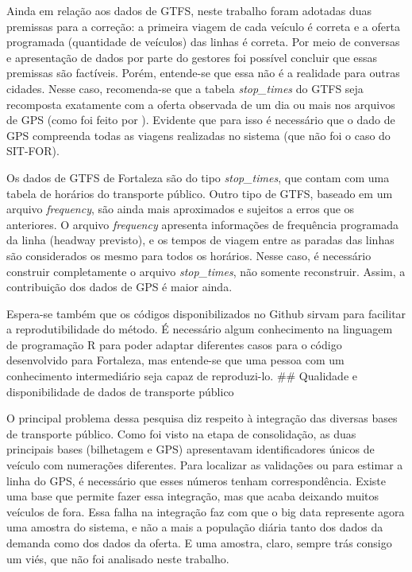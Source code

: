 \documentclass[        
    a4paper,          %
    12pt,             %
    chapter=TITLE,    %
    section=Title,    %
    subsection=Title, %
    oneside,          %
    english,          %
    spanish,          %
    brazil,           %
    fleqn             %
]{abntex2}
\begin{document}
  Ainda em relação aos dados de GTFS, neste trabalho foram adotadas duas premissas para a correção: a primeira viagem de cada veículo é correta e a oferta programada (quantidade de veículos) das linhas é correta. Por meio de conversas e apresentação de dados por parte do gestores foi possível concluir que essas premissas são factíveis. Porém, entende-se que essa não é a realidade para outras cidades. Nesse caso, recomenda-se que a tabela \emph{stop\_times} do GTFS seja recomposta exatamente com a oferta observada de um dia ou mais nos arquivos de GPS (como foi feito por \citet{Wessel2017}). Evidente que para isso é necessário que o dado de GPS compreenda todas as viagens realizadas no sistema (que não foi o caso do SIT-FOR).
  
  Os dados de GTFS de Fortaleza são do tipo \emph{stop\_times}, que contam com uma tabela de horários do transporte público. Outro tipo de GTFS, baseado em um arquivo \emph{frequency}, são ainda mais aproximados e sujeitos a erros que os anteriores. O arquivo \emph{frequency} apresenta informações de frequência programada da linha (headway previsto), e os tempos de viagem entre as paradas das linhas são considerados os mesmo para todos os horários. Nesse caso, é necessário construir completamente o arquivo \emph{stop\_times}, não somente reconstruir. Assim, a contribuição dos dados de GPS é maior ainda.
  
  Espera-se também que os códigos disponibilizados no Github sirvam para facilitar a reprodutibilidade do método. É necessário algum conhecimento na linguagem de programação R para poder adaptar diferentes casos para o código desenvolvido para Fortaleza, mas entende-se que uma pessoa com um conhecimento intermediário seja capaz de reproduzi-lo.
  \#\# Qualidade e disponibilidade de dados de transporte público
  
  O principal problema dessa pesquisa diz respeito à integração das diversas bases de transporte público. Como foi visto na etapa de consolidação, as duas principais bases (bilhetagem e GPS) apresentavam identificadores únicos de veículo com numerações diferentes. Para localizar as validações ou para estimar a linha do GPS, é necessário que esses números tenham correspondência. Existe uma base que permite fazer essa integração, mas que acaba deixando muitos veículos de fora. Essa falha na integração faz com que o big data represente agora uma amostra do sistema, e não a mais a população diária tanto dos dados da demanda como dos dados da oferta. E uma amostra, claro, sempre trás consigo um viés, que não foi analisado neste trabalho.
  
\end{document}
